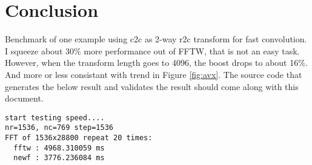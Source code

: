 \documentclass[a4paper,12pt]{article}
\begin{document}
\section{Conclusion}
Benchmark of one example using c2c as 2-way r2c transform for fast convolution. 
I squeeze about 30\% more performance out of FFTW, that is not an easy task.
However, when the transform length goes to 4096, the boost drops to about 16\%. 
And more or less consistant with trend in Figure \ref{fig:avx}.
The source code that generates the below result and validates the result should come along with this document.
\begin{verbatim}
start testing speed....
nr=1536, nc=769 step=1536
FFT of 1536x28800 repeat 20 times:
  fftw : 4968.310059 ms
  newf : 3776.236084 ms
\end{verbatim}
\end{document}
